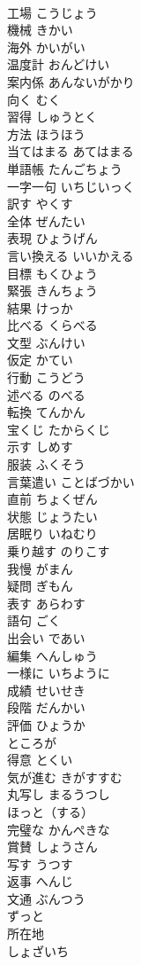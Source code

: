 \documentclass[8pt]{extreport}
\begin{document}
\begin{CJK}{UTF8}{min}
\\	工場	こうじょう	
\\	機械	きかい	
\\	海外	かいがい	
\\	温度計	おんどけい	
\\	案内係	あんないがかり	
\\	向く	むく	
\\	習得	しゅうとく	
\\	方法	ほうほう	
\\	当てはまる	あてはまる	
\\	単語帳	たんごちょう	
\\	一字一句	いちじいっく	
\\	訳す	やくす	
\\	全体	ぜんたい	
\\	表現	ひょうげん	
\\	言い換える	いいかえる	
\\	目標	もくひょう	
\\	緊張	きんちょう	
\\	結果	けっか	
\\	比べる	くらべる	
\\	文型	ぶんけい	
\\	仮定	かてい	
\\	行動	こうどう	
\\	述べる	のべる	
\\	転換	てんかん	
\\	宝くじ	たからくじ	
\\	示す	しめす	
\\	服装	ふくそう	
\\	言葉遣い	ことばづかい	
\\	直前	ちょくぜん	
\\	状態	じょうたい	
\\	居眠り	いねむり	
\\	乗り越す	のりこす	
\\	我慢	がまん	
\\	疑問	ぎもん	
\\	表す	あらわす	
\\	語句	ごく	
\\	出会い	であい	
\\	編集	へんしゅう	
\\	一様に	いちように	
\\	成績	せいせき	
\\	段階	だんかい	
\\	評価	ひょうか	
\\	ところが		
\\	得意	とくい	
\\	気が進む	きがすすむ	
\\	丸写し	まるうつし	
\\	ほっと（する）		
\\	完璧な	かんぺきな	
\\	賞賛	しょうさん	
\\	写す	うつす	
\\	返事	へんじ	
\\	文通	ぶんつう	
\\	ずっと		
\\	所在地
\\	しょざいち	
\end{CJK}
\end{document}
